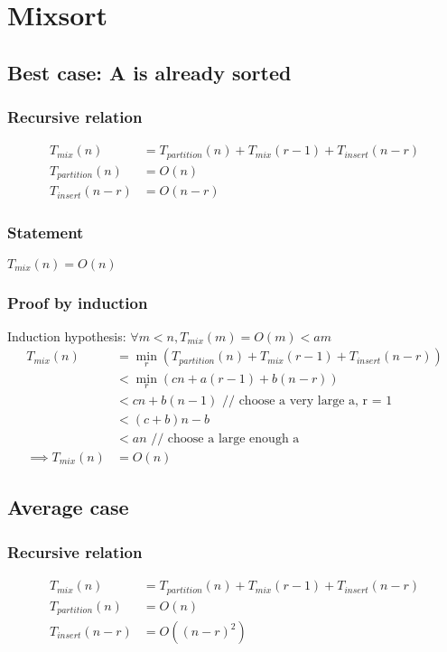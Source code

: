 \documentclass{article}
\begin{document}
\section{Mixsort}

\subsection{Best case: A is already sorted}

\subsubsection{Recursive relation}
\begin{align*}
T_{mix}(n) &= T_{partition}(n) + T_{mix}(r-1) + T_{insert}(n-r)\\
T_{partition}(n) &= O(n)\\
T_{insert}(n-r) &= O(n-r)
\end{align*}

\subsubsection{Statement}
$T_{mix}(n) = O(n)$

\subsubsection{Proof by induction}
Induction hypothesis: $\forall m < n, T_{mix}(m) = O(m ) < am$
\begin{align*}
T_{mix}(n)
&= \min_r (T_{partition}(n) + T_{mix}(r-1) + T_{insert}(n-r))\\
&< \min_r (cn + a(r-1) + b(n-r))\\
&< cn + b(n-1) \text{ // choose a very large a, r = 1}\\
&< (c + b)n -b\\
&< an \text{ // choose a large enough a}\\
\implies T_{mix}(n) &= O(n)
\end{align*}

\subsection{Average case}

\subsubsection{Recursive relation}
\begin{align*}
T_{mix}(n) &= T_{partition}(n) + T_{mix}(r-1) + T_{insert}(n-r)\\
T_{partition}(n) &= O(n)\\
T_{insert}(n-r) &= O((n-r)^2)
\end{align*}
\end{document}
